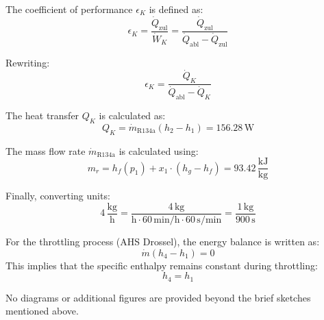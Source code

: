 The coefficient of performance \( \epsilon_K \) is defined as:  
\[
\epsilon_K = \frac{\dot{Q}_{\text{zul}}}{\dot{W}_K} = \frac{\dot{Q}_{\text{zul}}}{\dot{Q}_{\text{abl}} - \dot{Q}_{\text{zul}}}
\]  

Rewriting:  
\[
\epsilon_K = \frac{\dot{Q}_K}{\dot{Q}_{\text{abl}} - \dot{Q}_K}
\]  

The heat transfer \( Q_K \) is calculated as:  
\[
Q_K = \dot{m}_{\text{R134a}} (h_2 - h_1) = 156.28 \, \text{W}
\]  

The mass flow rate \( \dot{m}_{\text{R134a}} \) is calculated using:  
\[
m_r = h_f(p_1) + x_1 \cdot (h_g - h_f) = 93.42 \, \frac{\text{kJ}}{\text{kg}}
\]  

Finally, converting units:  
\[
4 \, \frac{\text{kg}}{\text{h}} = \frac{4 \, \text{kg}}{\text{h} \cdot 60 \, \text{min/h} \cdot 60 \, \text{s/min}} = \frac{1 \, \text{kg}}{900 \, \text{s}}
\]

For the throttling process (AHS Drossel), the energy balance is written as:  
\[
\dot{m} (h_4 - h_1) = 0
\]  
This implies that the specific enthalpy remains constant during throttling:  
\[
h_4 = h_1
\]  

No diagrams or additional figures are provided beyond the brief sketches mentioned above.
